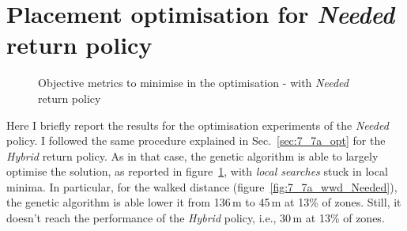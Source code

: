 \section{Placement optimisation for \textit{Needed} return policy}
\label{sec:7_7b_needed}

 
 \begin{figure}[h]
     \centering     %
     \caption{Objective metrics to minimise in the optimisation - with \textit{Needed} return policy}
    \label{fig:7_7a_optimized_metrics_needed}
 \end{figure}
 
Here I briefly report the results for the optimisation experiments of the \textit{Needed} policy.
I followed the same procedure explained in Sec.~\ref{sec:7_7a_opt} for the \textit{Hybrid} return policy. As in that case, the genetic algorithm is able to largely optimise the solution, as reported in figure~\ref{fig:7_7a_optimized_metrics_needed}, with \textit{local searches} stuck in local minima. 
In particular, for the walked distance (figure~\ref{fig:7_7a_wwd_Needed}), the genetic algorithm is able lower it from 136\,m to 45\,m at 13\% of zones. Still, it doesn't reach the performance of the \textit{Hybrid} policy, i.e., 30\,m at 13\% of zones.

